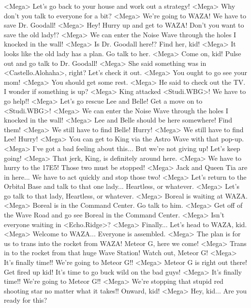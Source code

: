 <Mega> Let's go back to your house and work out a strategy! 
<Mega> Why don't you talk to everyone for a bit? 
<Mega> We're going to WAZA! We have to save Dr. Goodall! 
<Mega> Hey! Hurry up and get to WAZA! Don't you want to save the old lady!? 
<Mega> We can enter the Noise Wave through the holes I knocked in the wall! 
<Mega> Is Dr. Goodall here!? Find her, kid! 
<Mega> It looks like the old lady has a plan. Go talk to her. 
<Mega> Come on, kid! Pulse out and go talk to Dr. Goodall! 
<Mega> She said something was in <Castello.Alohaha>, right? Let's check it out. 
<Mega> You ought to go see your mom! 
<Mega> You should get some rest. 
<Mega> He said to check out the TV. I wonder if something is up? 
<Mega> King attacked <Studi.WBG>! We have to go help!! 
<Mega> Let's go rescue Lee and Belle! Get a move on to <Studi.WBG>! 
<Mega> We can enter the Noise Wave through the holes I knocked in the wall! 
<Mega> Lee and Belle should be here somewhere! Find them! 
<Mega> We still have to find Belle! Hurry! 
<Mega> We still have to find Lee! Hurry! 
<Mega> You can get to King via the Astro Wave with that pop-up. 
<Mega> I've got a bad feeling about this... But we're not giving up! Let's keep going! 
<Mega> That jerk, King, is definitely around here. 
<Mega> We have to hurry to the {17}{E5}! Those two must be stopped! 
<Mega> Jack and Queen Tia are in here... We have to act quickly and stop those two! 
<Mega> Let's return to the Orbital Base and talk to that one lady... Heartless, or whatever. 
<Mega> Let's go talk to that lady, Heartless, or whatever. 
<Mega> Boreal is waiting at WAZA. 
<Mega> Boreal is in the Command Center. Go talk to him. 
<Mega> Get off of the Wave Road and go see Boreal in the Command Center. 
<Mega> Isn't everyone waiting in <Echo.Ridge>? 
<Mega> Finally... Let's head to WAZA, kid. 
<Mega> Welcome to WAZA... Everyone is assembled. 
<Mega> The plan is for us to trans into the rocket from WAZA! Meteor G, here we come! 
<Mega> Trans in to the rocket from that huge Wave Station! Watch out, Meteor G! 
<Mega> It's finally time!! We're going to Meteor G!! 
<Mega> Meteor G is right out there! Get fired up kid! It's time to go buck wild on the bad guys! 
<Mega> It's finally time!! We're going to Meteor G!! 
<Mega> We're stopping that stupid red shooting star no matter what it takes!! Onward, kid! 
<Mega> Hey, kid... Are you ready for this? 

